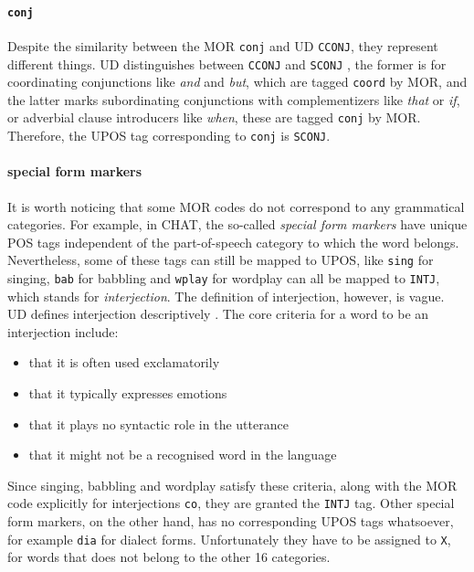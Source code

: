 \paragraph{\texttt{conj}}
Despite the similarity between the MOR \texttt{conj} and UD \texttt{CCONJ}, they represent different things. UD distinguishes between \texttt{CCONJ}  and \texttt{SCONJ} , the former is for coordinating conjunctions like \emph{and} and \emph{but}, which are tagged \texttt{coord} by MOR, and the latter marks subordinating conjunctions with complementizers like \emph{that} or \emph{if}, or adverbial clause introducers like \emph{when}, these are tagged \texttt{conj} by MOR. Therefore, the UPOS tag corresponding to \texttt{conj} is \texttt{SCONJ}.

\paragraph{special form markers}
It is worth noticing that some MOR codes do not correspond to any grammatical categories. For example, in CHAT, the so-called \emph{special form markers} have unique POS tags independent of the part-of-speech category to which the word belongs. Nevertheless, some of these tags can still be mapped to UPOS, like \texttt{sing} for singing, \texttt{bab} for babbling and \texttt{wplay} for wordplay can all be mapped to \texttt{INTJ}, which stands for \emph{interjection}. The definition of interjection, however, is vague. UD defines interjection descriptively . The core criteria for a word  to be an interjection include:
\begin{itemize}
	\item that it is often used exclamatorily
	\item that it typically expresses emotions
	\item that it plays no syntactic role in the utterance
	\item that it might not be a recognised word in the language
\end{itemize}
Since singing, babbling and wordplay satisfy these criteria, along with the MOR code explicitly for interjections \texttt{co}, they are granted the \texttt{INTJ} tag. Other special form markers, on the other hand, has no corresponding UPOS tags whatsoever, for example \texttt{dia} for dialect forms. Unfortunately they have to be assigned to \texttt{X}, for words that does not belong to the other 16 categories.

